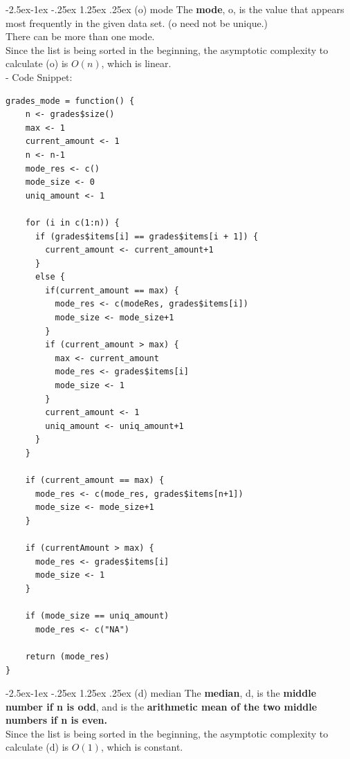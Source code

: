 \documentclass[11pt]{article}
\makeatletter
\renewcommand\paragraph{\@startsection{paragraph}{4}{\z@}%
            {-2.5ex\@plus -1ex \@minus -.25ex}%
            {1.25ex \@plus .25ex}%
            {\normalfont\normalsize\bfseries}}
\makeatother
\begin{document}
\paragraph{(o) mode}
The \textbf{mode}, o, is the value that appears most frequently in the given data set. (o need not be unique.)\\

There can be more than one mode.\\

Since the list is being sorted in the beginning, the asymptotic complexity to calculate (o) is $O(n)$, which is linear.\\

- Code Snippet:\\

\begin{lstlisting}
grades_mode = function() {
    n <- grades$size()
    max <- 1
    current_amount <- 1
    n <- n-1
    mode_res <- c()
    mode_size <- 0
    uniq_amount <- 1
    
    for (i in c(1:n)) {
      if (grades$items[i] == grades$items[i + 1]) {
        current_amount <- current_amount+1
      }
      else {
        if(current_amount == max) {
          mode_res <- c(modeRes, grades$items[i])
          mode_size <- mode_size+1
        }
        if (current_amount > max) {
          max <- current_amount
          mode_res <- grades$items[i]
          mode_size <- 1
        }
        current_amount <- 1
        uniq_amount <- uniq_amount+1
      }
    }
    
    if (current_amount == max) {
      mode_res <- c(mode_res, grades$items[n+1])
      mode_size <- mode_size+1
    }
    
    if (currentAmount > max) {
      mode_res <- grades$items[i]
      mode_size <- 1
    }
    
    if (mode_size == uniq_amount)
      mode_res <- c("NA")
    
    return (mode_res)
}
\end{lstlisting}

\paragraph{(d) median}
The \textbf{median}, d, is the \textbf{middle number if n is odd}, and is the \textbf{arithmetic mean of the two middle numbers if n is even.}\\

Since the list is being sorted in the beginning, the asymptotic complexity to calculate (d) is $O(1)$, which is constant.\\
\end{document}
